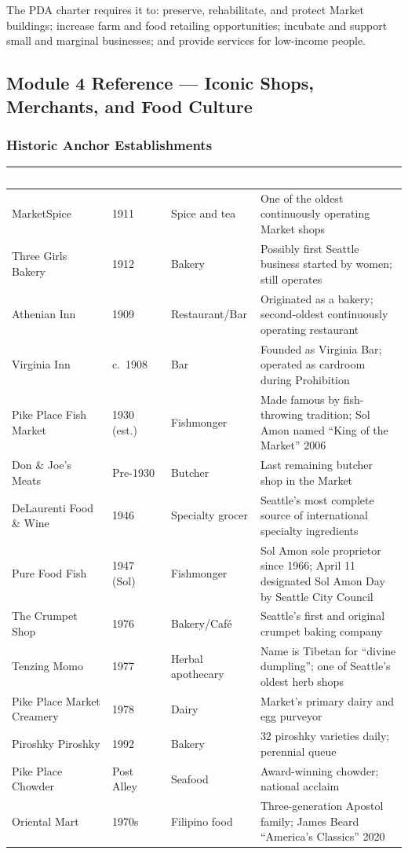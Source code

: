 \documentclass[11pt,letterpaper]{article}
\newcommand{\tableheader}[1]{\textbf{\sffamily\textcolor{white}{#1}}}
\begin{document}
The PDA charter requires it to: preserve, rehabilitate, and protect Market buildings; increase farm and food retailing opportunities; incubate and support small and marginal businesses; and provide services for low-income people.

\subsection{Module 4 Reference --- Iconic Shops, Merchants, and Food Culture}

\subsubsection{Historic Anchor Establishments}

\begin{center}
\begin{tabularx}{\textwidth}{L{3.5cm}C{1.8cm}L{2.5cm}X}
\toprule
{}
\tableheader{Establishment} & \tableheader{Founded} & \tableheader{Category} & \tableheader{Notes} \\
\midrule
MarketSpice & 1911 & Spice and tea & One of the oldest continuously operating Market shops \\
Three Girls Bakery & 1912 & Bakery & Possibly first Seattle business started by women; still operates \\
Athenian Inn & 1909 & Restaurant/Bar & Originated as a bakery; second-oldest continuously operating restaurant \\
Virginia Inn & c.\ 1908 & Bar & Founded as Virginia Bar; operated as cardroom during Prohibition \\
Pike Place Fish Market & 1930 (est.) & Fishmonger & Made famous by fish-throwing tradition; Sol Amon named ``King of the Market'' 2006 \\
Don \& Joe's Meats & Pre-1930 & Butcher & Last remaining butcher shop in the Market \\
DeLaurenti Food \& Wine & 1946 & Specialty grocer & Seattle's most complete source of international specialty ingredients \\
Pure Food Fish & 1947 (Sol) & Fishmonger & Sol Amon sole proprietor since 1966; April 11 designated Sol Amon Day by Seattle City Council \\
The Crumpet Shop & 1976 & Bakery/Café & Seattle's first and original crumpet baking company \\
Tenzing Momo & 1977 & Herbal apothecary & Name is Tibetan for ``divine dumpling''; one of Seattle's oldest herb shops \\
Pike Place Market Creamery & 1978 & Dairy & Market's primary dairy and egg purveyor \\
Piroshky Piroshky & 1992 & Bakery & 32 piroshky varieties daily; perennial queue \\
Pike Place Chowder & Post Alley & Seafood & Award-winning chowder; national acclaim \\
Oriental Mart & 1970s & Filipino food & Three-generation Apostol family; James Beard ``America's Classics'' 2020 \\
\bottomrule
\end{tabularx}
\end{center}
\end{document}
